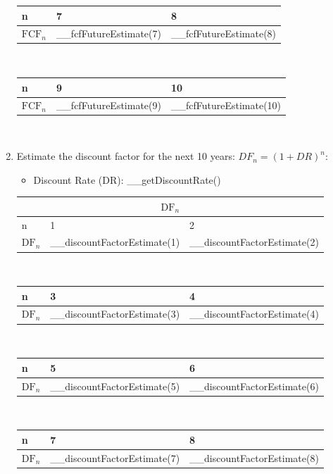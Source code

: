 \begin{enumerate}
\begin{tabularx}{\textwidth}{|X|X|X|}
 \hline
 n & 7 & 8 \\
 \hline
 \rowcolor{lightgray} $\text{FCF}_n$ & __fcfFutureEstimate(7) & __fcfFutureEstimate(8) \\
 \hline
\end{tabularx}\\

\begin{tabularx}{\textwidth}{|X|X|X|}
 \hline
 n & 9 & 10 \\
 \hline
 \rowcolor{lightgray} $\text{FCF}_n$ & __fcfFutureEstimate(9) & __fcfFutureEstimate(10) \\
 \hline
\end{tabularx}\\
	\item Estimate the discount factor for the next 10 years: $DF_n = (1+DR)^n$:
	\begin{itemize}
        \item Discount Rate (DR): __getDiscountRate()
    \end{itemize}
\begin{tabularx}{\textwidth}{|X|X|X|}
 \hline
 \multicolumn{3}{|c|}{$\text{DF}_n$} \\
 \hline
 n & 1 & 2 \\
 \hline
 \rowcolor{lightgray} $\text{DF}_n$ & __discountFactorEstimate(1) & __discountFactorEstimate(2) \\
 \hline
\end{tabularx}\\

\begin{tabularx}{\textwidth}{|X|X|X|}
 \hline
 n & 3 & 4 \\
 \hline
 \rowcolor{lightgray} $\text{DF}_n$ & __discountFactorEstimate(3) & __discountFactorEstimate(4) \\
 \hline
\end{tabularx}\\

\begin{tabularx}{\textwidth}{|X|X|X|}
 \hline
 n & 5 & 6 \\
 \hline
 \rowcolor{lightgray} $\text{DF}_n$ & __discountFactorEstimate(5) & __discountFactorEstimate(6) \\
 \hline
\end{tabularx}\\

\begin{tabularx}{\textwidth}{|X|X|X|}
 \hline
 n & 7 & 8 \\
 \hline
 \rowcolor{lightgray} $\text{DF}_n$ & __discountFactorEstimate(7) & __discountFactorEstimate(8) \\
 \hline
\end{tabularx}\\


\end{enumerate}
